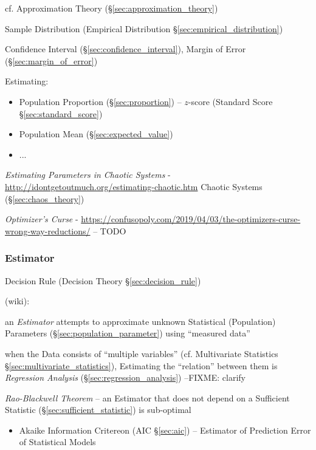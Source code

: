 \fist cf. Approximation Theory (\S\ref{sec:approximation_theory})

Sample Distribution (Empirical Distribution \S\ref{sec:empirical_distribution})

Confidence Interval (\S\ref{sec:confidence_interval}), Margin of Error
(\S\ref{sec:margin_of_error})

Estimating:
\begin{itemize}
  \item Population Proportion (\S\ref{sec:proportion}) -- $z$-score (Standard
    Score \S\ref{sec:standard_score})
  \item Population Mean (\S\ref{sec:expected_value})
  \item ...
\end{itemize}

\emph{Estimating Parameters in Chaotic Systems} -
\url{http://idontgetoutmuch.org/estimating-chaotic.htm} \fist Chaotic Systems
(\S\ref{sec:chaos_theory})

\asterism

\emph{Optimizer's Curse} -
\url{https://confusopoly.com/2019/04/03/the-optimizers-curse-wrong-way-reductions/}
-- TODO



\subsubsection{Estimator}\label{sec:estimator}

\fist Decision Rule (Decision Theory \S\ref{sec:decision_rule})

(wiki):

an \emph{Estimator} attempts to approximate unknown Statistical (Population)
Parameters (\S\ref{sec:population_parameter}) using ``measured data''

when the Data consists of ``multiple variables'' (cf. Multivariate Statistics
\S\ref{sec:multivariate_statistics}), Estimating the ``relation'' between them
is \emph{Regression Analysis} (\S\ref{sec:regression_analysis})
--FIXME: clarify

\emph{Rao-Blackwell Theorem} -- an Estimator that does not depend on a
Sufficient Statistic (\S\ref{sec:sufficient_statistic}) is sub-optimal

\begin{itemize}
  \item Akaike Information Critereon (AIC \S\ref{sec:aic}) --
    Estimator of Prediction Error of Statistical Models
\end{itemize}



